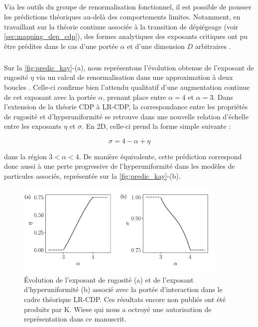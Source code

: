 \subparagraph{}Via les outils du groupe de renormalisation fonctionnel, il est possible de pousser les prédictions théoriques au-delà des comportements limites. Notamment, en travaillant sur la théorie continue associée à la transition de dépiégeage (voir \autoref{sec:mapping_dep_cdp}), des formes analytiques des exposants critiques ont pu être prédites dans le cas d'une portée $\alpha$ et d'une dimension $D$ arbitraires \cite{wiese_theory_2022, wiese_longrange}. 

\subparagraph{}Sur la \autoref{fig:predic_kay}-(a), nous représentons l'évolution obtenue de l'exposant de rugosité $\eta$ via un calcul de renormalisation dans une approximation à deux boucles \cite{wiese_longrange}. Celle-ci confirme bien l'attendu qualitatif d'une augmentation continue de cet exposant avec la portée $\alpha$, prenant place entre $\alpha = 4$ et $\alpha = 3$. Dans l'extension de la théorie CDP à LR-CDP, la correspondance entre les propriétés de rugosité et d'hyperuniformité se retrouve dans une nouvelle relation d'échelle entre les exposants $\eta$ et $\sigma$. En 2D, celle-ci prend la forme simple suivante \cite{wiese_longrange} :

\begin{equation}
	\sigma = 4 - \alpha + \eta
\end{equation}

\noindent dans la région $3<\alpha < 4$. De manière équivalente, cette prédiction correspond donc aussi à une perte progressive de l'hyperuniformité dans les modèles de particules associés, représentée sur la \autoref{fig:predic_kay}-(b).

\begin{figure}[h]
	\centering
	\includegraphics[width=0.9\textwidth]{Chapitre2/Figures/eta_kay.pdf}
	\caption{Évolution de l'exposant de rugosité (a) et de l'exposant d'hyperuniformité (b) associé avec la portée d'interaction dans le cadre théorique LR-CDP. Ces résultats encore non publiés ont été produits par K. Wiese qui nous a octroyé une autorisation de représentation dans ce manuscrit.}
	\label{fig:predic_kay}
\end{figure}


